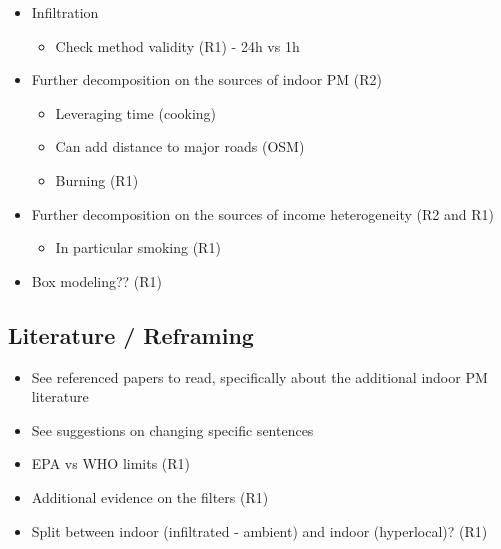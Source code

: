 \documentclass[12pt,english]{article}
\begin{document}
\begin{itemize}
    \item Infiltration
    \begin{itemize}
        \item Check method validity (R1) - 24h vs 1h
    \end{itemize}
    \item Further decomposition on the sources of indoor PM (R2)
    \begin{itemize}
        \item Leveraging time (cooking)
        \item Can add distance to major roads (OSM)
        \item Burning (R1)
    \end{itemize}
    \item Further decomposition on the sources of income heterogeneity (R2 and R1)
    \begin{itemize}
        \item In particular smoking (R1)
    \end{itemize}
    \item Box modeling?? (R1)
\end{itemize}

\subsection{Literature / Reframing}
\begin{itemize}
    \item See referenced papers to read, specifically about the additional indoor PM literature
    \item See suggestions on changing specific sentences
    \item EPA vs WHO limits (R1)
    \item Additional evidence on the filters (R1)
    \item Split between indoor (infiltrated - ambient) and indoor (hyperlocal)? (R1)
\end{itemize}
\end{document}

